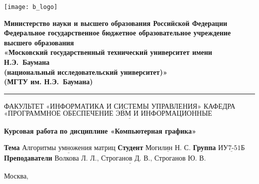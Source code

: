 \thispagestyle{empty}

\noindent \begin{minipage}{0.15\textwidth}
	\texttt{[image: b\_logo]}
\end{minipage}
\noindent\begin{minipage}{0.85\textwidth}\centering
	\textbf{Министерство науки и высшего образования Российской Федерации}\\
	\textbf{Федеральное государственное бюджетное образовательное учреждение высшего образования}\\
	\textbf{«Московский государственный технический университет имени Н.Э.~Баумана}\\
	\textbf{(национальный исследовательский университет)»}\\
	\textbf{(МГТУ им. Н.Э.~Баумана)}
\end{minipage}

\noindent\rule{\linewidth}{3pt}
\newline\newline
\noindent ФАКУЛЬТЕТ $\underline{\text{«ИНФОРМАТИКА И СИСТЕМЫ УПРАВЛЕНИЯ»}}$ \newline\newline
\noindent КАФЕДРА $\underline{\text{«ПРОГРАММНОЕ ОБЕСПЕЧЕНИЕ ЭВМ И ИНФОРМАЦИОННЫЕ ТЕХНОЛОГИИ»}}$

\vspace{1cm}

\begin{center}
	\noindent\begin{minipage}{1.3\textwidth}\centering
		\Large\textbf{ Курсовая работа }\newline
		\textbf{по дисциплине «Компьютерная графика»}\newline\newline
	\end{minipage}
\end{center}

\noindent\textbf{Тема} $\underline{\text{Алгоритмы умножения матриц}}$\newline\newline
\noindent\textbf{Студент} $\underline{\text{Могилин~Н.~С.}}$\newline\newline
\noindent\textbf{Группа} $\underline{\text{ИУ7-51Б}}$\newline\newline
\noindent\textbf{Преподаватели} $\underline{\text{Волкова~Л.~Л., Строганов~Д.~В., Строганов~Ю.~В.}}$\newline

\begin{center}
	\vfill
	Москва,~\the\year
\end{center}
\clearpage
